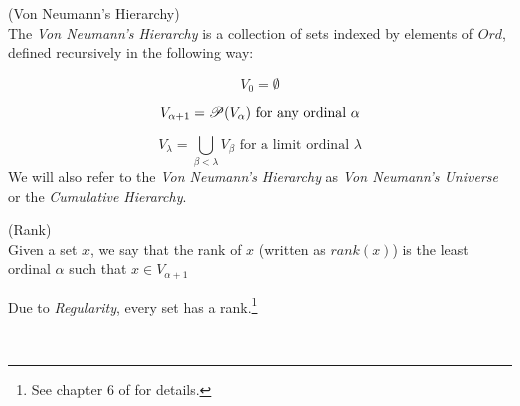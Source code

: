 
\begin{definition}{(Von Neumann's Hierarchy)}\label{def:von_neumann}\\ %
The \emph{Von Neumann's Hierarchy} is a collection of sets indexed by elements of $Ord$, defined recursively in the following way:
\bce[(i)]
\item 
\begin{equation}
V_0 = \emptyset
\end{equation}
\item 
\begin{equation}
V_{\alpha+1} = \mathscr{P} (V_\alpha)\mbox{ for any ordinal $\alpha$}
\end{equation}
\item
\begin{equation} 
V_\lambda = \bigcup_{\beta < \lambda} V_\beta \mbox{ for a limit ordinal $\lambda$}
\end{equation}
\ece
We will also refer to the \emph{Von Neumann's Hierarchy} as \emph{Von Neumann's Universe} or the \emph{Cumulative Hierarchy}. %
\end{definition}

\begin{definition}{(Rank)}\label{def:rank}\\ %
Given a set $x$, we say that the rank of $x$ (written as $rank(x)$) is the least ordinal $\alpha$ such that $x \in V_{\alpha+1}$
\end{definition}
Due to \emph{Regularity}, every set has a rank.\footnote{See chapter 6 of \cite{JechBook} for details.}


\

